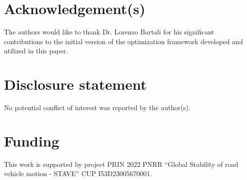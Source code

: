 \documentclass[]{interact}
\theoremstyle{plain}%
\theoremstyle{definition}
\theoremstyle{remark}
\begin{document}







\section*{Acknowledgement(s)}

The authors would like to thank Dr. Lorenzo Bartali for his significant contributions to the initial version of the optimization framework developed and utilized in this paper.


\section*{Disclosure statement}

No potential conflict of interest was reported by the author(s).

\section*{Funding}

This work is supported by project PRIN 2022 PNRR ``Global Stability of road vehicle motion - STAVE'' CUP I53D23005670001.



%
%
%
%
%
%
%
\end{document}
